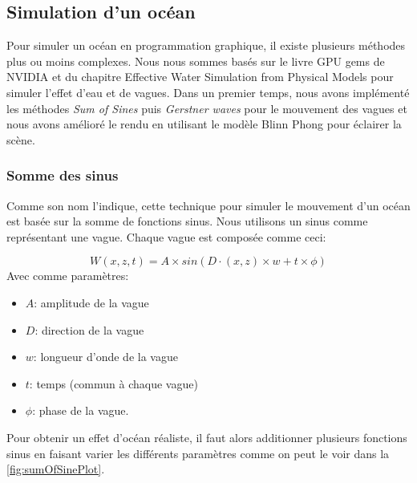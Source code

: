 \pagebreak
\subsection{Simulation d'un océan}

Pour simuler un océan en programmation graphique, il existe plusieurs méthodes plus ou moins complexes. Nous nous sommes basés sur le livre GPU gems de NVIDIA et du chapitre \og Effective Water Simulation from Physical Models\fg \citep{eau} pour simuler l'effet d'eau et de vagues. Dans un premier temps, nous avons implémenté les méthodes \textit{Sum of Sines}  puis \textit{Gerstner waves} pour le mouvement des vagues et nous avons amélioré le rendu en utilisant le modèle Blinn Phong\cite{blinn} pour éclairer la scène.

\subsubsection{Somme des sinus}
Comme son nom l'indique, cette technique pour simuler le mouvement d'un océan est basée sur la somme de fonctions sinus. Nous utilisons un sinus comme représentant une vague. Chaque vague est composée comme ceci:

\[W(x,z,t) = A \times sin( D \cdot (x, z) \times w + t \times \phi)\]
\newline
Avec comme paramètres:
\begin{itemize}
	\item $A$: amplitude de la vague
	\item $D$: direction de la vague
	\item $w$: longueur d'onde de la vague
	\item $t$: temps (commun à chaque vague)
	\item $\phi$: phase de la vague.
\end{itemize}

Pour obtenir un effet d'océan réaliste, il faut alors additionner plusieurs fonctions sinus en faisant varier les différents paramètres comme on peut le voir dans la \autoref{fig:sumOfSinePlot}.


